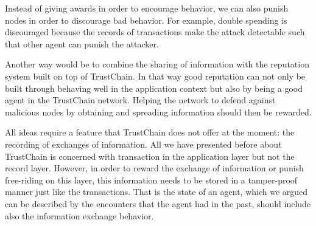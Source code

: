 Instead of giving awards in order to encourage behavior, we can also punish nodes in order to discourage
bad behavior. For example, double spending is discouraged because the records of transactions make 
the attack detectable such that other agent can punish the attacker. 

Another way would be to combine the sharing of information with the reputation system built on top 
of TrustChain. In that way good reputation can not only be built through behaving well in the 
application context but also by being a good agent in the TrustChain network. Helping the network to
defend against malicious nodes by obtaining and spreading information should then be rewarded. 

All ideas require a feature that TrustChain does not offer at the moment: the recording of exchanges
of information. All we have presented before about TrustChain is concerned with transaction in the 
application layer but not the record layer. However, in order to reward the exchange of information 
or punish free-riding on this layer, this information needs to be stored in a tamper-proof manner
just like the transactions. That is the state of an agent, which we argued can be described by the
encounters that the agent had in the past, should include also the information exchange behavior.










